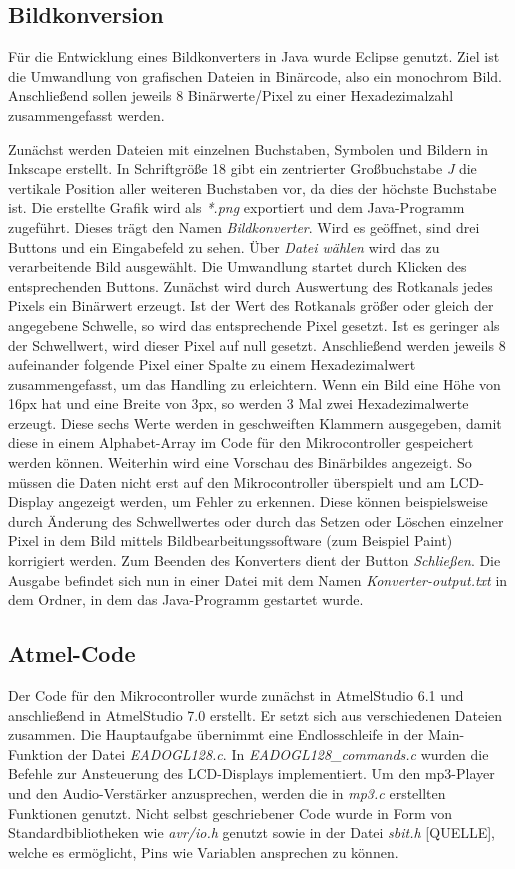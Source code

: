 \documentclass[journal, a4paper]{IEEEtran}
\begin{document}
	\subsection{Bildkonversion}
		\label{sc:Software:subsc:Bildkonverter}
		Für die Entwicklung eines Bildkonverters in Java wurde Eclipse genutzt. Ziel ist die Umwandlung von grafischen Dateien in Binärcode, also ein monochrom Bild. Anschließend sollen jeweils 8 Binärwerte/Pixel zu einer Hexadezimalzahl zusammengefasst werden.\par 
		Zunächst werden Dateien mit einzelnen Buchstaben, Symbolen und Bildern in Inkscape erstellt. In Schriftgröße 18 gibt ein zentrierter Großbuchstabe \textit{J} die vertikale Position aller weiteren Buchstaben vor, da dies der höchste Buchstabe ist. Die erstellte Grafik wird als \textit{*.png} exportiert und dem Java-Programm zugeführt. Dieses trägt den Namen \textit{Bildkonverter}. Wird es geöffnet, sind drei Buttons und ein Eingabefeld zu sehen. Über \textit{Datei wählen} wird das zu verarbeitende Bild ausgewählt. Die Umwandlung startet durch Klicken des entsprechenden Buttons. Zunächst wird durch Auswertung des Rotkanals jedes Pixels ein Binärwert erzeugt. Ist der Wert des Rotkanals größer oder gleich der angegebene Schwelle, so wird das entsprechende Pixel gesetzt. Ist es geringer als der Schwellwert, wird dieser Pixel auf null gesetzt. Anschließend werden jeweils 8 aufeinander folgende Pixel einer Spalte zu einem Hexadezimalwert zusammengefasst, um das Handling zu erleichtern. Wenn ein Bild eine Höhe von 16px hat und eine Breite von 3px, so werden 3 Mal zwei Hexadezimalwerte erzeugt. Diese sechs Werte werden in geschweiften Klammern ausgegeben, damit diese in einem Alphabet-Array im Code für den Mikrocontroller gespeichert werden können. Weiterhin wird eine Vorschau des Binärbildes angezeigt. So müssen die Daten nicht erst auf den Mikrocontroller überspielt und am LCD-Display angezeigt werden, um Fehler zu erkennen. Diese können beispielsweise durch Änderung des Schwellwertes oder durch das Setzen oder Löschen einzelner Pixel in dem Bild mittels Bildbearbeitungssoftware (zum Beispiel Paint) korrigiert werden. Zum Beenden des Konverters dient der Button \textit{Schließen}. Die Ausgabe befindet sich nun in einer Datei mit dem Namen \textit{Konverter-output.txt} in dem Ordner, in dem das Java-Programm gestartet wurde.\par
	\subsection{Atmel-Code}
	\label{sc:Software:subsc:Atmel-Code}
	Der Code für den Mikrocontroller wurde zunächst in AtmelStudio 6.1 und anschließend in AtmelStudio 7.0 erstellt. Er setzt sich aus verschiedenen Dateien zusammen. Die Hauptaufgabe übernimmt eine Endlosschleife in der Main-Funktion der Datei \emph{EADOGL128.c}. In \emph{EADOGL128\_commands.c} wurden die Befehle zur Ansteuerung des LCD-Displays implementiert. Um den mp3-Player und den Audio-Verstärker anzusprechen, werden die in \emph{mp3.c} erstellten Funktionen genutzt. Nicht selbst geschriebener Code wurde in Form von Standardbibliotheken wie \emph{avr/io.h} genutzt sowie in der Datei \emph{sbit.h} [QUELLE], welche es ermöglicht, Pins wie Variablen ansprechen zu können.
	
\end{document}
